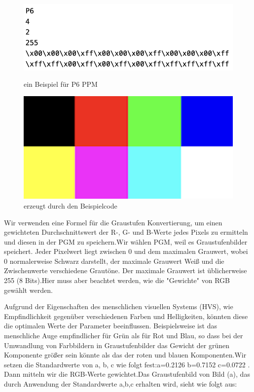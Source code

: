 \documentclass[course=erap]{aspdoc}
\begin{document}
\begin{figure}[h]
\begin{minipage}{0.45\textwidth}
\centering
\includegraphics[width=\textwidth]{Bilder/demograph.png}
\caption{ein Beispiel für P6 PPM}
\end{minipage}
\hfill
\begin{minipage}{0.45\textwidth}
\centering
\includegraphics[width=\textwidth]{Bilder/demograph.ppm.png}
\caption{erzeugt durch den Beispielcode}
\end{minipage}
\end{figure}


\par
Wir verwenden eine Formel für die Graustufen Konvertierung, um einen gewichteten Durchschnittswert der R-, G- und B-Werte jedes Pixels zu ermitteln und diesen in der PGM zu speichern.Wir wählen PGM, weil es Graustufenbilder speichert. Jeder Pixelwert liegt zwischen 0 und dem maximalen Grauwert, wobei 0 normalerweise Schwarz darstellt, der maximale Grauwert Weiß und die Zwischenwerte verschiedene Grautöne. Der maximale Grauwert ist üblicherweise 255 (8 Bits).Hier muss aber beachtet werden, wie die "Gewichte" von RGB gewählt werden. 

\par
Aufgrund der Eigenschaften des menschlichen visuellen Systems (HVS), wie Empfindlichkeit gegenüber verschiedenen Farben und Helligkeiten, könnten diese die optimalen Werte der Parameter beeinflussen. Beispielsweise ist das menschliche Auge empfindlicher für Grün als für Rot und Blau, so dass bei der Umwandlung von Farbbildern in Graustufenbilder das Gewicht der grünen Komponente größer sein könnte als das der roten und blauen Komponenten.Wir setzen die Standardwerte von a, b, c wie folgt fest:a=0.2126 b=0.7152 c=0.0722 . Dann mitteln wir die RGB-Werte gewichtet.Das Graustufenbild von Bild (a), das durch Anwendung der Standardwerte a,b,c erhalten wird, sieht wie folgt aus:
\end{document}
